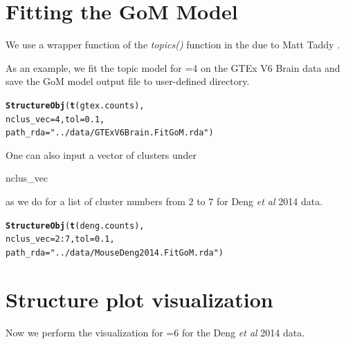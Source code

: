\documentclass[12pt]{article}\usepackage[]{graphicx}\usepackage[usenames,dvipsnames]{color}
\makeatletter
\newcommand{\hlnum}[1]{\textcolor[rgb]{0.686,0.059,0.569}{#1}}%
\newcommand{\hlstr}[1]{\textcolor[rgb]{0.192,0.494,0.8}{#1}}%
\newcommand{\hlopt}[1]{\textcolor[rgb]{0,0,0}{#1}}%
\newcommand{\hlstd}[1]{\textcolor[rgb]{0.345,0.345,0.345}{#1}}%
\newcommand{\hlkwc}[1]{\textcolor[rgb]{0.333,0.667,0.333}{#1}}%
\newcommand{\hlkwd}[1]{\textcolor[rgb]{0.737,0.353,0.396}{\textbf{#1}}}%
\newenvironment{kframe}{%
 \def\at@end@of@kframe{}%
 \ifinner\ifhmode%
  \def\at@end@of@kframe{\end{minipage}}%
  \begin{minipage}{\columnwidth}%
 \fi\fi%
 \def\FrameCommand##1{\hskip\@totalleftmargin \hskip-\fboxsep
 \colorbox{shadecolor}{##1}\hskip-\fboxsep
     \hskip-\linewidth \hskip-\@totalleftmargin \hskip\columnwidth}%
 \MakeFramed {\advance\hsize-\width
   \@totalleftmargin\z@ \linewidth\hsize
   \@setminipage}}%
 {\par\unskip\endMakeFramed%
 \at@end@of@kframe}
\newenvironment{knitrout}{}{} %
\makeatother
\begin{document}
\section{Fitting the GoM Model}

We use a wrapper function of the \textit{topics()} function in the  due to Matt Taddy \cite{Taddy2012}.

As an example, we fit the topic model for =4 on the GTEx V6 Brain data and save the GoM model output file to user-defined directory.

\begin{knitrout}
\color{fgcolor}\begin{kframe}
\begin{alltt}
\hlkwd{StructureObj}\hlstd{(}\hlkwd{t}\hlstd{(gtex.counts),}
            \hlkwc{nclus_vec}\hlstd{=}\hlnum{4}\hlstd{,} \hlkwc{tol}\hlstd{=}\hlnum{0.1}\hlstd{,}
             \hlkwc{path_rda}\hlstd{=}\hlstr{"../data/GTExV6Brain.FitGoM.rda"}\hlstd{)}
\end{alltt}
\end{kframe}
\end{knitrout}

One can also input a vector of clusters under \begin{verb} nclus_vec \end{verb} as we do for a list of cluster numbers from $2$ to $7$ for Deng \textit{et al} 2014 data.

\begin{knitrout}
\color{fgcolor}\begin{kframe}
\begin{alltt}
\hlkwd{StructureObj}\hlstd{(}\hlkwd{t}\hlstd{(deng.counts),}
            \hlkwc{nclus_vec}\hlstd{=}\hlnum{2}\hlopt{:}\hlnum{7}\hlstd{,} \hlkwc{tol}\hlstd{=}\hlnum{0.1}\hlstd{,}
             \hlkwc{path_rda}\hlstd{=}\hlstr{"../data/MouseDeng2014.FitGoM.rda"}\hlstd{)}
\end{alltt}
\end{kframe}
\end{knitrout}



\section{Structure plot visualization}

Now we perform the visualization for =$6$ for the Deng \textit{et al} 2014 data.
\end{document}
